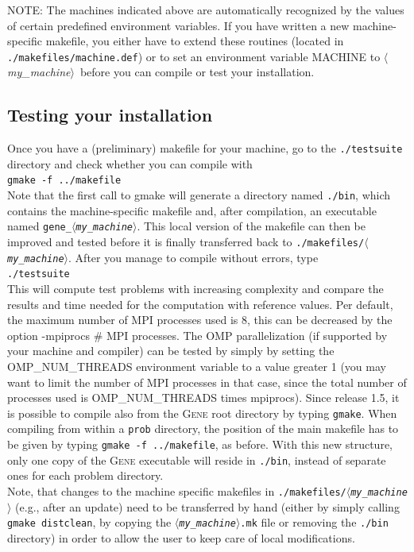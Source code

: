 \documentclass[12pt]{article}
\newcommand{\mach}{$\langle$\textsl{my\_machine}$\rangle$}
\begin{document}
NOTE: The machines indicated above are automatically recognized by the values of certain predefined
environment variables. If you have written a new machine-specific makefile, you either have to
extend these routines (located in {\tt ./makefiles/machine.def})
or to set an environment variable MACHINE to \mach\ before you can compile or test your installation.

\subsection{Testing your installation}
Once you have a (preliminary) makefile for your machine, go to the \texttt{./testsuite} directory
and check whether you can compile with\\
\qquad\verb|gmake -f ../makefile| \\
Note that the first call to gmake will generate a directory named \texttt{./bin}, which contains
the machine-specific makefile and, after compilation, an executable named \texttt{gene\_\mach}.
This local version of the makefile can then be improved and tested before it is finally transferred back to
\texttt{./makefiles/\mach}.
After you manage to compile without errors, type \\
\qquad\verb|./testsuite| \\
This will compute test problems with increasing complexity and
compare the results and time needed for the computation with reference values.
Per default, the maximum number of MPI processes used is 8, this can be decreased by the option
-mpiprocs \# MPI processes. The OMP parallelization (if supported by your machine and compiler) can
be tested by simply by setting the OMP\_NUM\_THREADS environment variable to a value greater 1 (you
may want to limit the number of MPI processes in that case, since the total number of processes used is
OMP\_NUM\_THREADS times mpiprocs).
Since release 1.5, it is possible to compile also from the \textsc{Gene} root directory
by typing \verb|gmake|. When compiling from within a \texttt{prob} directory, the position of the main
makefile has to be given by typing \verb|gmake -f ../makefile|, as before. With this new structure,
only one copy of the \textsc{Gene} executable will reside in \texttt{./bin}, instead of
separate ones for each problem directory. \\
Note, that changes to the machine specific makefiles in \texttt{./makefiles/\mach}
(e.g., after an update) need to be transferred by hand (either by simply calling \texttt{gmake distclean},
by copying the \texttt{\mach .mk} file or removing the \texttt{./bin} directory) in order to allow
the user to keep care of local modifications.
\end{document}
